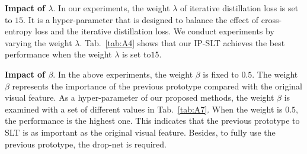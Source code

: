 \documentclass[10pt,twocolumn,letterpaper]{article}
\begin{document}
     \setlength{\tabcolsep}{2.7pt}
    \begin{table}[!t]
     \scriptsize
     \vspace{0.5mm}
     \caption{Effect of the different refinement methods. `Con-input' denotes directly concatenating the original visual feature and previous prototype as input. `Con-feature' denotes concatenating the original feature and the previous feature given by the cross-attention mechanism in each layer. On top of that, `Add-feature' denotes changing it to an addition operation.}
     \label{tab:A6}
     \vspace{-1mm}
     \end{table}
     

    

    \smallskip
    \noindent \textbf{Impact of $\lambda$}.
    In our experiments, the weight $\lambda$ of iterative distillation loss is set to $15$. It is a hyper-parameter that is designed to balance the effect of cross-entropy loss and the iterative distillation loss.
    We conduct experiments by varying the weight $\lambda$.
    Tab.~\ref{tab:A4} shows that our IP-SLT achieves the best performance when the weight $\lambda$ is set to$15$.
    
    
    \smallskip
    \noindent \textbf{Impact of $\beta$}.
    In the above experiments, the weight $\beta$ is fixed to $0.5$. The weight $\beta$ represents the importance of the previous prototype compared with the original visual feature. As a hyper-parameter of our proposed methods, the weight $\beta$ is examined with a set of different values in Tab.~\ref{tab:A7}.
    When the weight is $0.5$, the performance is the highest one.
    This indicates that the previous prototype to SLT is as important as the original visual feature. 
    Besides, to fully use the previous prototype, the drop-net is required.
    
\end{document}
